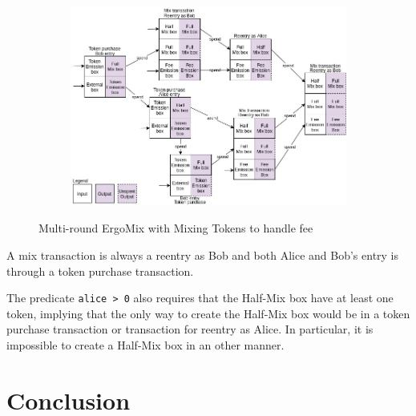 \documentclass[runningheads]{llncs}
\newcommand{\mixname}{ErgoMix\xspace}
\begin{document}
\begin{figure}[h]
	\centering
	\begin{subfigure}{0.9\textwidth}
		\centering
		\includegraphics[width=\linewidth]{MixingTokens.jpg}
	\end{subfigure}
	\caption{Multi-round \mixname with Mixing Tokens to handle fee}
\label{fig:mixingtokens}
\end{figure}

A mix transaction is always a reentry as Bob and both Alice and Bob's entry is through a token purchase transaction. 

The predicate \texttt{alice > 0} also requires that the Half-Mix box have at least one token, implying that the only way to create the Half-Mix box would be in a token purchase transaction or transaction for reentry as Alice. In particular, it is impossible to create a Half-Mix box in an other manner.

\section{Conclusion}
\end{document}
